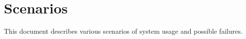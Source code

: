 
\newenvironment{scenario}[2]{%
	\newcommand{\case}[2]{%
			\paragraph{Beaviour in case ##1} \hfill \\
			##2
	}%
	\subsection{#2}\label{scenario:#1}
}{
}

\section{Scenarios}
This document describes various scenarios of system usage and possible failures.

